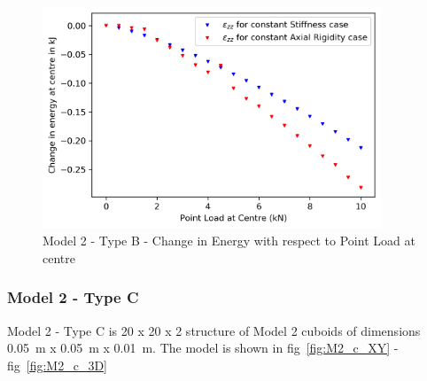 \begin{figure}[!htbp]
    \centering
    \includegraphics[width = 0.9\textwidth]{Figures/M2_b_energy.png}
    \caption{Model 2 - Type B - Change in Energy with respect to Point Load at centre}
    \label{fig:M2_b_energy}
\end{figure}

 \newpage
 \subsubsection{Model 2 - Type C}
 Model 2 - Type C is 20 x 20 x 2 structure of Model 2 cuboids of dimensions 0.05~m x 0.05~m x 0.01~m. The model is shown in fig~\ref{fig:M2_c_XY} - fig~\ref{fig:M2_c_3D}

